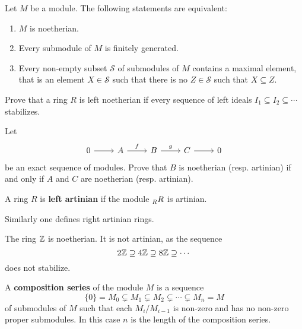\begin{exercise}
    Let $M$ be a module. The following statements are equivalent:
    \begin{enumerate}
        \item $M$ is noetherian.
        \item Every submodule of $M$ is finitely generated. 
        \item Every non-empty subset $\mathcal{S}$ of submodules of $M$ contains a maximal element, that is
            an element $X\in\mathcal{S}$ such that there is no $Z\in\mathcal{S}$ such that $X\subseteq Z$.  
    \end{enumerate}
\end{exercise}

\begin{exercise}
    Prove that a ring $R$ is left noetherian if every sequence of 
    left ideals $I_1\subseteq I_2\subseteq\cdots$ stabilizes. 
\end{exercise}

\begin{exercise}
\label{xca:AN_exact}
	Let 
	\[
	\begin{tikzcd}
		0 \arrow{r}
		& A \arrow{r}{f}
		& B \arrow{r}{g}
		& C \arrow{r}
		& 0
	\end{tikzcd}
	\]
	be an exact sequence of modules. Prove that $B$ is noetherian (resp.
	artinian) if and only if $A$ and $C$ are noetherian (resp. artinian).
\end{exercise}


\begin{definition}
	A ring $R$ is \textbf{left artinian} if the module 
	$\prescript{}{R}R$ is artinian.
\end{definition}

Similarly one defines right artinian rings. 

\begin{example}
	The ring $\mathbb{Z}$ is noetherian. It is not artinian, as the sequence
	\[
	2\mathbb{Z}\supseteq
	4\mathbb{Z}\supseteq 8\mathbb{Z}\supseteq\cdots
	\]
	does not stabilize. 
\end{example}

\begin{definition}
	\label{def:serie_de_composicion}
	A \textbf{composition series} of the module $M$ is a sequence 
	\[
		\{0\}=M_0\subsetneq M_1\subsetneq M_2\subsetneq\cdots\subsetneq M_n=M
	\]
	of submodules of $M$ such that each $M_i/M_{i-1}$ is non-zero and has no non-zero 
	proper submodules. 
	In this case 
	$n$ is the length of the composition series.
\end{definition}

